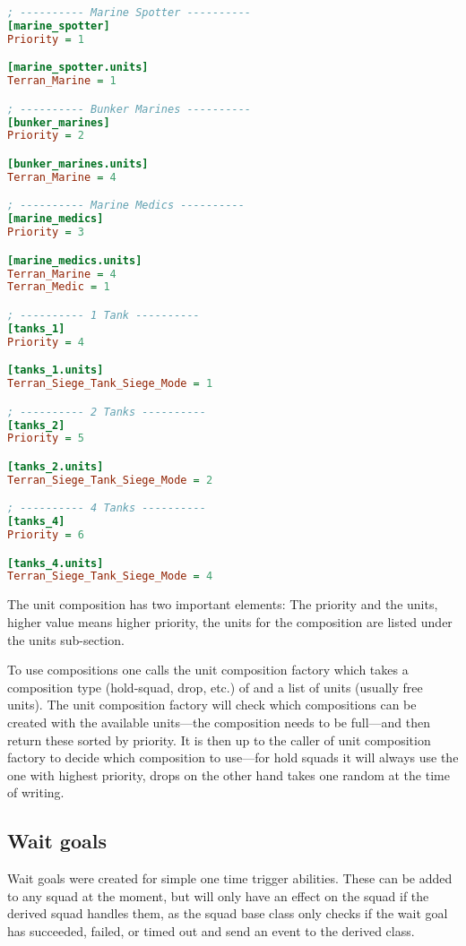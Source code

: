 \begin{lstlisting}[caption={Hold squad unit compositions},label={lst:unit_composition_defense},language=ini]
; ---------- Marine Spotter ----------
[marine_spotter]
Priority = 1

[marine_spotter.units]
Terran_Marine = 1

; ---------- Bunker Marines ----------
[bunker_marines]
Priority = 2

[bunker_marines.units]
Terran_Marine = 4

; ---------- Marine Medics ----------
[marine_medics]
Priority = 3

[marine_medics.units]
Terran_Marine = 4
Terran_Medic = 1

; ---------- 1 Tank ----------
[tanks_1]
Priority = 4

[tanks_1.units]
Terran_Siege_Tank_Siege_Mode = 1

; ---------- 2 Tanks ----------
[tanks_2]
Priority = 5

[tanks_2.units]
Terran_Siege_Tank_Siege_Mode = 2

; ---------- 4 Tanks ----------
[tanks_4]
Priority = 6

[tanks_4.units]
Terran_Siege_Tank_Siege_Mode = 4
\end{lstlisting}
The unit composition has two important elements: The priority and the units, higher value means higher priority, the units for the composition are listed under the units sub-section.

To use compositions one calls the unit composition factory which takes a composition type (hold-squad, drop, etc.) of and a list of units (usually free units). The unit composition factory will check which compositions can be created with the available units—the composition needs to be full—and then return these sorted by priority. It is then up to the caller of unit composition factory to decide which composition to use—for hold squads it will always use the one with highest priority, drops on the other hand takes one random at the time of writing.

\subsection{Wait goals}
\label{sec:wait_goals}
Wait goals were created for simple one time trigger abilities. These can be added to any squad at the moment, but will only have an effect on the squad if the derived squad handles them, as the squad base class only checks if the wait goal has succeeded, failed, or timed out and send an event to the derived class.

